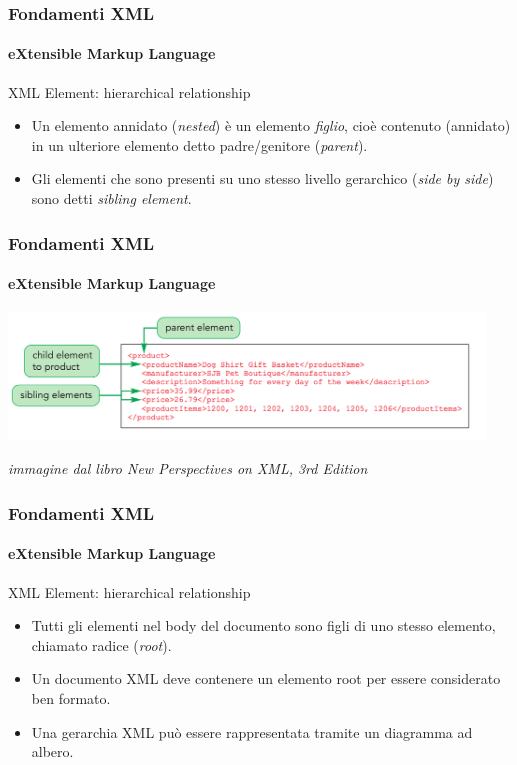 \begin{frame}
    \frametitle{Fondamenti XML}
    \framesubtitle{eXtensible Markup Language}
    \addtocounter{nframe}{1}

	\begin{block}{XML Element: hierarchical relationship}
		\begin{itemize}
			\item Un elemento annidato (\textit{nested}) è un elemento \textit{figlio}, cioè contenuto (annidato) in un ulteriore elemento detto padre/genitore (\textit{parent}).
			\item Gli elementi che sono presenti su uno stesso livello gerarchico (\textit{side by side}) sono detti \textit{sibling element}.
		\end{itemize}
	\end{block}

\end{frame}

\begin{frame}
	\frametitle{Fondamenti XML}
	\framesubtitle{eXtensible Markup Language}
	\addtocounter{nframe}{1}

	\begin{center}
		\includegraphics[width=0.95\textwidth]{imgs/XML-Parent-Child-Sibling.png}
    \end{center}
\begin{tiny}\textit{immagine dal libro New Perspectives on XML, 3rd Edition}\end{tiny}

\end{frame}

\begin{frame}
    \frametitle{Fondamenti XML}
    \framesubtitle{eXtensible Markup Language}
    \addtocounter{nframe}{1}

	\begin{block}{XML Element: hierarchical relationship}
		\begin{itemize}
			\item Tutti gli elementi nel body del documento sono figli di uno stesso elemento, chiamato radice (\textit{root}).
			\item Un documento XML deve contenere un elemento root per essere considerato ben formato.
			\item Una gerarchia XML può essere rappresentata tramite un diagramma ad albero.
		\end{itemize}
	\end{block}

\end{frame}


